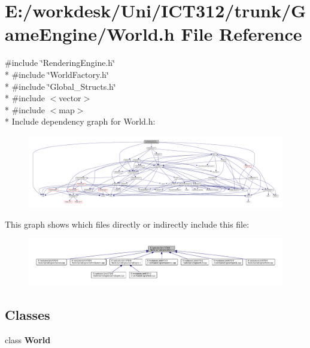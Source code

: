 \section{E\+:/workdesk/\+Uni/\+I\+C\+T312/trunk/\+Game\+Engine/\+World.h File Reference}
\label{_world_8h}
{\ttfamily \#include \char`\"{}Rendering\+Engine.\+h\char`\"{}}\\*
{\ttfamily \#include \char`\"{}World\+Factory.\+h\char`\"{}}\\*
{\ttfamily \#include \char`\"{}Global\+\_\+\+Structs.\+h\char`\"{}}\\*
{\ttfamily \#include $<$vector$>$}\\*
{\ttfamily \#include $<$map$>$}\\*
Include dependency graph for World.\+h\+:
\nopagebreak
\begin{figure}[H]
\begin{center}
\leavevmode
\includegraphics[width=350pt]{dd/d4b/_world_8h__incl}
\end{center}
\end{figure}
This graph shows which files directly or indirectly include this file\+:\nopagebreak
\begin{figure}[H]
\begin{center}
\leavevmode
\includegraphics[width=350pt]{d5/d7b/_world_8h__dep__incl}
\end{center}
\end{figure}
\subsection*{Classes}
\begin{DoxyCompactItemize}
\item 
class {\bf World}
\end{DoxyCompactItemize}
